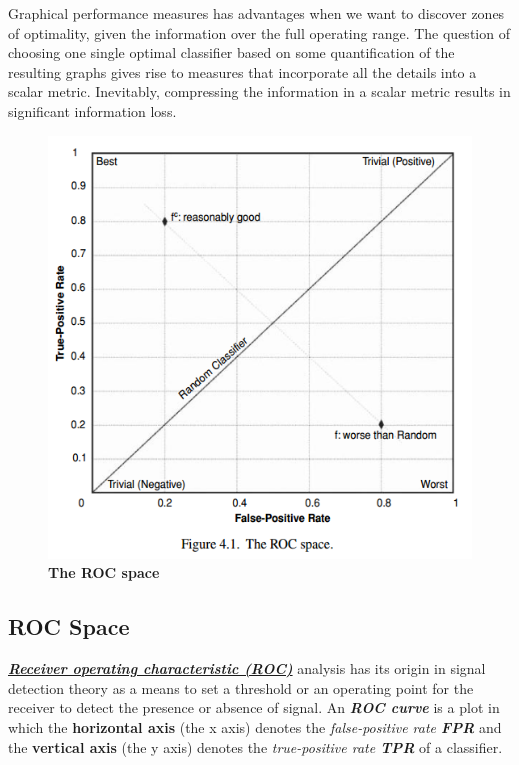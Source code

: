 \documentclass[11pt]{article}
\begin{document}
Graphical performance measures has advantages when we want to discover zones of optimality, given the information over the full operating range. The question
of choosing one single optimal classifier based on some quantification of the resulting graphs gives rise to measures that incorporate all the details into a scalar metric. Inevitably, compressing the information in a scalar metric results in significant information loss.
\begin{figure}
\begin{minipage}[t]{1\linewidth}
  \centering
  \centerline{\includegraphics[scale = 0.5]{roc_curve.png}}
\end{minipage}
\caption{\footnotesize{\textbf{The ROC space}}}
\label{fig: roc_curve}
\end{figure}
\subsection{ROC Space}
\underline{\emph{\textbf{Receiver operating characteristic (ROC)}}} analysis has its origin in signal detection theory as a means to set a threshold or an operating point for the receiver to detect the presence or absence of signal. An \emph{\textbf{ROC curve}} is a plot in which the \textbf{horizontal axis} (the x axis) denotes the \emph{false-positive rate \textbf{FPR}} and the \textbf{vertical axis} (the y axis) denotes the \emph{true-positive rate \textbf{TPR}} of a classifier. 
\end{document}
